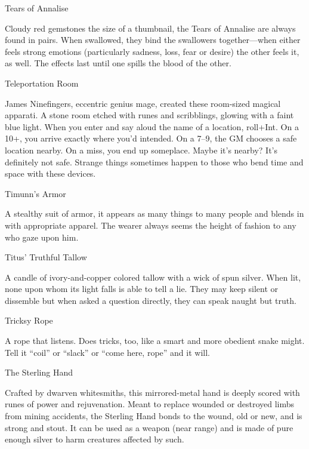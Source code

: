 Tears of Annalise	 

 

Cloudy red gemstones the size of a thumbnail, the Tears of Annalise are always found in pairs. When swallowed, they bind the swallowers together—when either feels strong emotions (particularly sadness, loss, fear or desire) the other feels it, as well. The effects last until one spills the blood of the other.

 

Teleportation Room	 

 

James Ninefingers, eccentric genius mage, created these room-sized magical apparati. A stone room etched with runes and scribblings, glowing with a faint blue light. When you enter and say aloud the name of a location, roll+Int. On a 10+, you arrive exactly where you’d intended. On a 7–9, the GM chooses a safe location nearby. On a miss, you end up someplace. Maybe it’s nearby? It’s definitely not safe. Strange things sometimes happen to those who bend time and space with these devices.

 

Timunn's Armor	 

 

A stealthy suit of armor, it appears as many things to many people and blends in with appropriate apparel. The wearer always seems the height of fashion to any who gaze upon him.

 

Titus’ Truthful Tallow	 

 

A candle of ivory-and-copper colored tallow with a wick of spun silver. When lit, none upon whom its light falls is able to tell a lie. They may keep silent or dissemble but when asked a question directly, they can speak naught but truth.

 

Tricksy Rope	 

 

A rope that listens. Does tricks, too, like a smart and more obedient snake might. Tell it “coil” or “slack” or “come here, rope” and it will. 

 

The Sterling Hand	 

 

Crafted by dwarven whitesmiths, this mirrored-metal hand is deeply scored with runes of power and rejuvenation. Meant to replace wounded or destroyed limbs from mining accidents, the Sterling Hand bonds to the wound, old or new, and is strong and stout. It can be used as a weapon (near range) and is made of pure enough silver to harm creatures affected by such.

